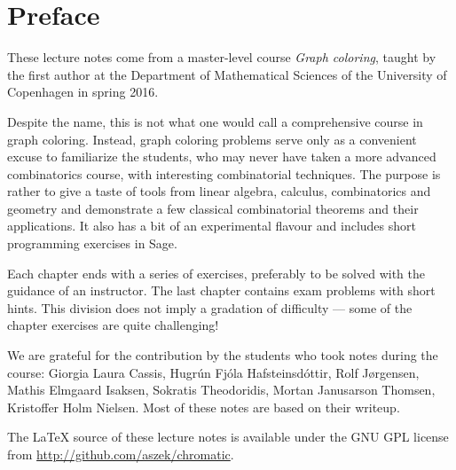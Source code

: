 \chapter{Preface}

These lecture notes come from a master-level course \emph{Graph coloring}, taught by the first author at the Department of Mathematical Sciences of the University of Copenhagen in spring 2016.

\medskip
Despite the name, this is not what one would call a comprehensive course in graph coloring. Instead, graph coloring problems serve only as a convenient excuse to familiarize the students, who may never have taken a more advanced combinatorics course, with interesting combinatorial techniques. The purpose is rather to give a taste of tools from linear algebra, calculus, combinatorics and geometry and demonstrate a few classical combinatorial theorems and their applications. It also has a bit of an experimental flavour and includes short programming exercises in Sage.

\medskip
Each chapter ends with a series of exercises, preferably to be solved with the guidance of an instructor. The last chapter contains exam problems with short hints. This division does not imply a gradation of difficulty --- some of the chapter exercises are quite challenging!

\medskip
We are grateful for the contribution by the students who took notes during the course: Giorgia Laura Cassis, Hugr\'un Fj\'ola Hafsteinsd\'ottir, Rolf J{\o}rgensen, Mathis Elmgaard Isaksen, Sokratis Theodoridis, Mortan Janusarson Thomsen, Kristoffer Holm Nielsen. Most of these notes are based on their writeup.

\medskip
The LaTeX source of these lecture notes is available under the GNU GPL license from \url{http://github.com/aszek/chromatic}.